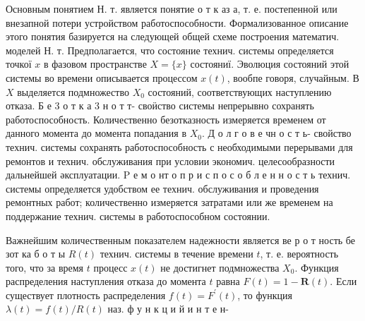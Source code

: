 \documentclass[10pt]{article}
\begin{document}
Основным понятием Н. т. является понятие о т к аз а, т. е. постепенной или внезапной потери устройством работоспособности. Формализованное описание этого понятия базируется на следующей общей схеме построения математич. моделей Н. т. Предполагается, что состояние технич. системы определяется точкої $x$ в фазовом пространстве $X=\{x\}$ состояниї. Эволюция состояний этой системы во времени описывается процессом $x(t)$, вообпе говоря, случайным. В $X$ выделяется подмножество $X_{0}$ состояний, соответствующих наступлению отказа. Б е 3 о т к а 3 н о т т- своӥство системы непрерывно сохранять работоспособность. Количественно безотказность измеряется временем от данного момента до момента попадания в $X_{0}$. Д о л г о в е чн о с т ь- свойство технич. системы сохранять работоспособность с необходимыми перерывами для ремонтов и технич. обслуживания при условии экономич. целесообразности дальнейшей әксплуатации. $\mathrm{P}$ е м о нт о п р и с п о с о б л е н н о с т ь технич. системы определяется удобством ее технич. обслуживания и проведения ремонтных работ; количественно измеряется затратами или же временем на поддержание технич. системы в работоспособном состоянии.



Важнейшим количественным показателем надежности является ве р о т ность бе зот ка б о т ы $R(t)$ технич. системы в течение времени $t$, т. е. вероятность того, что за время $t$ процесс $x(t)$ не достигнет подмножества $X_{0}$. Функция распределения наступления отказа до момента $t$ равна $F(t)=1-\boldsymbol{R}(t)$. Если существует плотность распределения $f(t)=F^{\prime}(t)$, то функция $\lambda(t)=f(t) / R(t)$ наз. ф у н к ц и й и н т е н-
\end{document}
